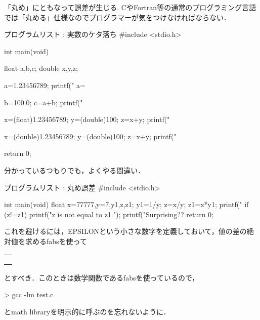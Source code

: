 「丸め」にともなって誤差が生じる. CやFortran等の通常のプログラミング言語では「丸める」仕様なのでプログラマーが気をつけなければならない．
\begin{MapleInput}
プログラムリスト : 実数のケタ落ち
#include <stdio.h>

int main(void){
  float a,b,c;
  double x,y,z;

  a=1.23456789;
  printf(" a= %

  b=100.0;
  c=a+b;
  printf("%

  x=(float)1.23456789;
  y=(double)100;
  z=x+y;
  printf("%
 
  x=(double)1.23456789;
  y=(double)100;
  z=x+y;
  printf("%

  return 0;
}
\end{MapleInput}

分かっているつもりでも，よくやる間違い．
\begin{MapleInput}
プログラムリスト : 丸め誤差
#include <stdio.h>

int main(void){
  float x=77777,y=7,y1,z,z1;
  y1=1/y;
  z=x/y;
  z1=x*y1;
  printf("%
  if (z!=z1){
    printf("z is not equal to z1.\n");
  }
  printf("Surprising?? \n\n\n\n\n%
  return 0; 
}
\end{MapleInput}
これを避けるには，EPSILONという小さな数字を定義しておいて，値の差の絶対値を求めるfabsを使って
\begin{table}[h]\begin{center}\begin{tabular}{|c|}
\hline
\hspace{100mm} \\ 
\\
\\
\hline
\end{tabular}\end{center}\end{table}%

とすべき．このときは数学関数であるfabsを使っているので，
\begin{MapleInput}
> gcc -lm test.c
\end{MapleInput}
とmath libraryを明示的に呼ぶのを忘れないように．